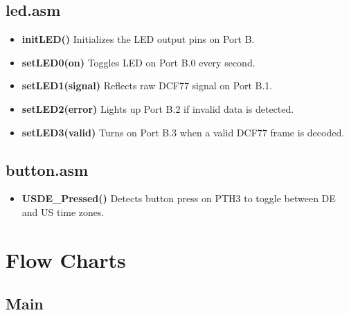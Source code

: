 \documentclass[a4paper,12pt]{article}
\begin{document}

\subsection{led.asm}
\begin{itemize}
    \item \textbf{initLED()}  
    Initializes the LED output pins on Port B.

    \item \textbf{setLED0(on)}  
    Toggles LED on Port B.0 every second.

    \item \textbf{setLED1(signal)}  
    Reflects raw DCF77 signal on Port B.1.

    \item \textbf{setLED2(error)}  
    Lights up Port B.2 if invalid data is detected.

    \item \textbf{setLED3(valid)}  
    Turns on Port B.3 when a valid DCF77 frame is decoded.
\end{itemize}


\subsection{button.asm}
\begin{itemize}
    \item \textbf{USDE\_Pressed()}  
    Detects button press on PTH3 to toggle between DE and US time zones.
\end{itemize}

\newpage


\section{Flow Charts}


\subsection{Main}
\end{document}
